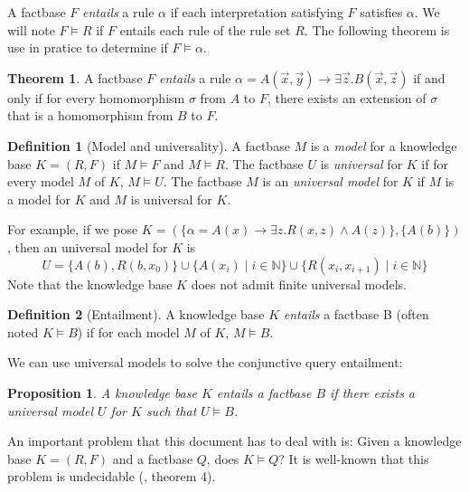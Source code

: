 \documentclass{article}
\newtheorem{proposition}{Proposition}[section]
\theoremstyle{definition}
\newtheorem{definition}{Definition}[section]
\newtheorem{theorem}{Theorem}[section]
\theoremstyle{remark}
\def \N {\mathbb N}
\begin{document}
A factbase $F$ \emph{entails} a rule $\alpha$ if each interpretation satisfying $F$ satisfies $\alpha$. We will note $F \models R$ if $F$ entails each rule of the rule set $R$. The following theorem is use in pratice to determine if $F \models \alpha$.

\begin{theorem}
A factbase $F$ \emph{entails} a rule $\alpha = A(\vec x,\vec y) \rightarrow \exists \vec z. B(\vec x,\vec z)$ if and only if for every homomorphism $\sigma$ from $A$ to $F$, there exists an extension of $\sigma$ that is a homomorphism from $B$ to $F$.
\end{theorem}

\begin{definition}[Model and universality]
A factbase $M$ is a \emph{model} for a knowledge base $K = (R,F)$ if $M \models F$ and $M \models R$. The factbase $U$ is \emph{universal} for $K$ if for every model $M$ of $K$, $M \models U$. The factbase $M$ is an \emph{universal model} for $K$ if $M$ is a model for $K$ and $M$ is universal for $K$.
\end{definition}

For example, if we pose $K = (\{\alpha = A(x) \rightarrow \exists z.R(x,z) \wedge A(z)\},\{A(b)\})$, then an universal model for $K$ is $$U = \{A(b),R(b,x_0)\}\cup \{A(x_i)\mid i \in \N\}\cup \{R(x_i,x_{i+1}) \mid i \in \N\}$$ Note that the knowledge base $K$ does not admit finite universal models.


\begin{definition}[Entailment]
A knowledge base $K$ \emph{entails} a factbase B (often noted $K \models B$) if for each model $M$ of $K$, $M \models B$.
\end{definition}

We can use universal models to solve the conjunctive query entailment:

\begin{proposition}
A knowledge base $K$ entails a factbase $B$ if there exists a universal model $U$ for $K$ such that $U \models B$.
\end{proposition}

An important problem that this document has to deal with is: Given a knowledge base $K=(R,F)$ and a factbase $Q$,  does $K \models Q$? It  is  well-known  that  this  problem  is  undecidable (\cite{NP2}, theorem 4). 
\end{document}

